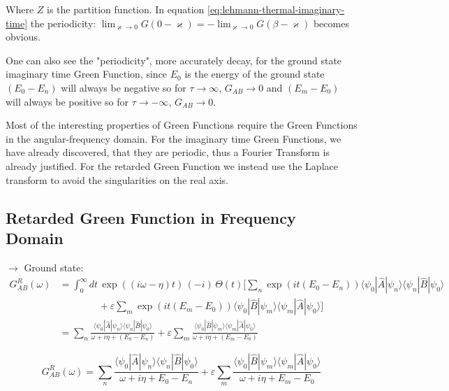 Where $Z$ is the partition function.
In equation \eqref{eq:lehmann-thermal-imaginary-time} the periodicity: $\lim_{\varkappa \to 0}G(0-\varkappa) = -\lim_{\varkappa \to 0}G(\beta-\varkappa)$
becomes obvious.

One can also see the "periodicity", more accurately decay, for the ground state imaginary time Green Function,
since $E_0$ is the energy of the ground state $(E_0 - E_n)$ will always be negative so for $\tau \to \infty$, $G_{AB} \to 0$ and $(E_m - E_0)$ will always be positive so for $\tau \to -\infty$, $G_{AB} \to 0$.

Most of the interesting properties of Green Functions require the Green Functions in the angular-frequency domain. 
For the imaginary time Green Functions, we have already discovered, that they are periodic, thus a Fourier Transform is already justified. 
For the retarded Green Function we instead use the Laplace transform to avoid the singularities on the real axis.

\subsection*{Retarded Green Function in Frequency Domain}

$\rightarrow$ Ground state:
\begin{align*}
    G^{R}_{AB}(\omega) &= \int_0^{\infty} dt\, \exp((i\omega - \eta)t)\, (-i)\, \Theta(t) \Big[ \sum_n \exp(it(E_0 - E_n)) \langle\psi_0| \hat{A} |\psi_n\rangle\langle\psi_n| \hat{B} |\psi_0\rangle \\
    &\qquad\qquad + \varepsilon \sum_m \exp(it(E_m - E_0)) \langle\psi_0| \hat{B} |\psi_m\rangle\langle\psi_m| \hat{A} |\psi_0\rangle \Big] \\[1ex]
    &= \sum_n \frac{\langle\psi_0| \hat{A} |\psi_n\rangle\langle\psi_n| \hat{B} |\psi_0\rangle}{\omega + i\eta + (E_0 - E_n)}
       + \varepsilon \sum_m \frac{\langle\psi_0| \hat{B} |\psi_m\rangle\langle\psi_m| \hat{A} |\psi_0\rangle}{\omega + i\eta + (E_m - E_0)}
\end{align*}

\begin{equation}
    \boxed{G^{R}_{AB}(\omega) = \sum_n \frac{\langle\psi_0| \hat{A} |\psi_n\rangle\langle\psi_n| \hat{B} |\psi_0\rangle}{\omega + i\eta + E_0 - E_n}
    + \varepsilon \sum_m \frac{\langle\psi_0| \hat{B} |\psi_m\rangle\langle\psi_m| \hat{A} |\psi_0\rangle}{\omega + i\eta + E_m - E_0}} \label{eq:lehmann-groundstate-retarded-frequency}
\end{equation}

